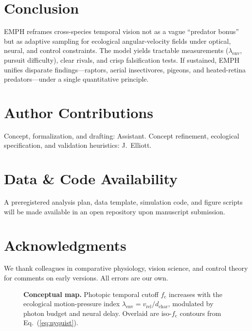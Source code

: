 \documentclass[11pt]{article}
\newcommand{\fc}{f_{\mathrm{c}}}             %
\newcommand{\vrel}{v_{\mathrm{rel}}}          %
\newcommand{\dchar}{d_{\mathrm{char}}}        %
\newcommand{\lamenv}{\lambda_{\mathrm{env}}}  %
\begin{document}
\section{Conclusion}
EMPH reframes cross-species temporal vision not as a vague ``predator bonus'' but as adaptive sampling for ecological angular-velocity fields under optical, neural, and control constraints. The model yields tractable measurements ($\lamenv$, pursuit difficulty), clear rivals, and crisp falsification tests. If sustained, EMPH unifies disparate findings---raptors, aerial insectivores, pigeons, and heated-retina predators---under a single quantitative principle.

\section*{Author Contributions}
Concept, formalization, and drafting: Assistant. Concept refinement, ecological specification, and validation heuristics: J.\ Elliott.

\section*{Data \& Code Availability}
A preregistered analysis plan, data template, simulation code, and figure scripts will be made available in an open repository upon manuscript submission.

\section*{Acknowledgments}
We thank colleagues in comparative physiology, vision science, and control theory for comments on early versions. All errors are our own.

\clearpage
\begin{figure}[t]
  \centering
  \fbox{\rule{0pt}{2.25in}\rule{0.9\linewidth}{0pt}}
  \caption{\textbf{Conceptual map.} Photopic temporal cutoff $\fc$ increases with the ecological motion-pressure index $\lamenv = \vrel/\dchar$, modulated by photon budget and neural delay. Overlaid are iso-$\fc$ contours from Eq.~(\ref{eq:nyquist}).}
  \label{fig:concept}
\end{figure}
\end{document}
